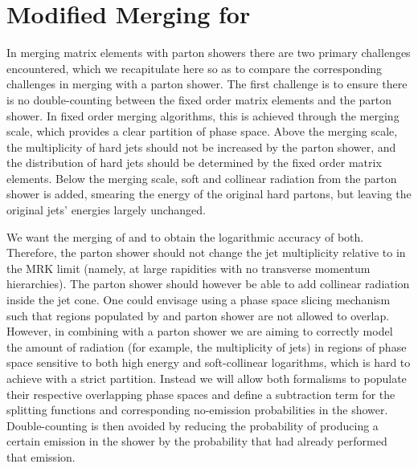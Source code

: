\def\sigmab{\ensuremath{\sigma_2^{\star}}}

\section{Modified Merging for \HEJ}
\label{sec:matching}

In merging matrix elements with parton showers there are two primary challenges encountered, which we recapitulate here so as to compare the corresponding 
challenges in merging \HEJ with a parton shower. The first challenge is to ensure there is no double-counting between the fixed order matrix elements and the parton shower.
In fixed order merging algorithms, this is achieved through the merging scale, which provides a clear partition of phase space. Above the merging scale, the multiplicity
of hard jets should not be increased by the parton shower, and the distribution of hard jets should be determined by the fixed order matrix elements.
Below the merging scale, soft and collinear radiation from the parton shower is added, smearing the energy of the original hard partons, but leaving the 
original jets' energies largely unchanged.

We want the merging of \HEJ and \pyt to obtain the logarithmic accuracy of
both. Therefore, the parton shower should not change the jet multiplicity relative to 
\HEJ in the MRK limit (namely, at large rapidities with no transverse momentum hierarchies).
The parton shower should however be able to add collinear radiation inside the jet cone. 
One could envisage using a phase space slicing mechanism such that
regions populated by \HEJ and parton shower are not allowed to
overlap.
However, in combining \HEJ with a parton shower 
we are aiming to correctly model the amount of radiation (for example, the multiplicity of jets)
in regions of phase space sensitive to both high energy and soft-collinear logarithms, which is hard to achieve with a strict partition.
Instead we will allow both
formalisms to populate their respective overlapping phase spaces and define a subtraction
term for the splitting functions and corresponding no-emission probabilities in the shower. 
Double-counting is then avoided by reducing
the probability of producing a certain emission in the shower by the probability that
\HEJ had already performed that emission. 

